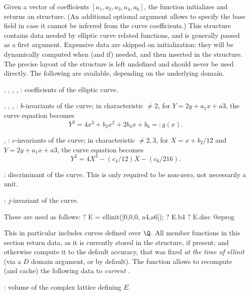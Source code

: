 Given a vector of coefficients $[a_1,a_2,a_3,a_4,a_6]$, the function
 initializes and returns an  structure. (An additional
optional argument allows to specify the base field in case it cannot be
inferred from the curve coefficients.) This structure contains data needed by
elliptic curve related functions, and is generally passed as a first argument.
Expensive data are skipped on initialization: they will be dynamically
computed when (and if) needed, and then inserted in the structure. The
precise layout of the  structure is left undefined and should never
be used directly. The following  are available,
depending on the underlying domain.


\item {}, , , , : coefficients of the
elliptic curve.

\item {}, , , : $b$-invariants of the curve; in
characteristic $\neq 2$, for $Y = 2y + a_1x+a3$, the curve equation becomes
$$ Y^2 = 4 x^3 + b_2 x^2 + 2b_4 x + b_6 =: g(x). $$

\item {}, : $c$-invariants of the curve; in characteristic $\neq
2,3$, for $X = x + b_2/12$ and $Y = 2y + a_1x+a3$, the curve equation becomes
$$ Y^2 = 4 X^3 - (c_4/12) X - (c_6/216). $$

\item {}: discriminant of the curve. This is only required to be
non-zero, not necessarily a unit.

\item {}: $j$-invariant of the curve.

\noindent These are used as follows:
\bprog
? E = ellinit([0,0,0, a4,a6]);
? E.b4
? E.disc
@eprog


This in particular includes curves defined over $\Q$. All member functions in
this section return data, as it is currently stored in the structure, if
present; and otherwise compute it to the default accuracy, that was fixed
\emph{at the time of ellinit} (via a  $D$ domain argument, or
 by default). The function  allows to
recompute (and cache) the following data to \emph{current}
.

\item {}: volume of the complex lattice defining $E$.

